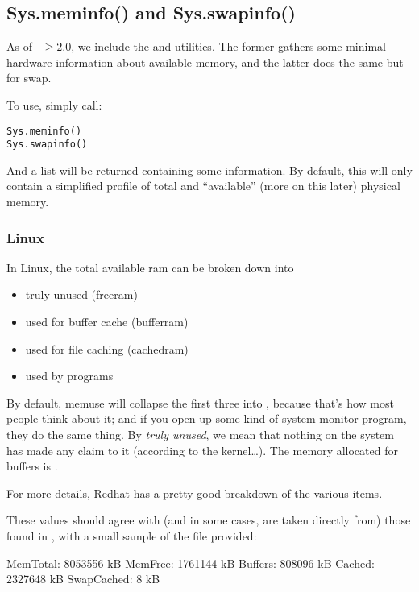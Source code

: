 \subsection{Sys.meminfo() and Sys.swapinfo()}

As of ~$\geq 2.0$, we include the  and 
 utilities.  The former gathers some minimal 
hardware information about available memory, and the latter does the same but 
for swap.

To use, simply call:
\begin{lstlisting}
Sys.meminfo()
Sys.swapinfo()
\end{lstlisting}

And a list will be returned containing some information.  By default, this will 
only contain a simplified profile of total and ``available'' (more on this 
later) physical memory. 





\subsubsection{Linux}
In Linux, the total available ram can be broken down into
\begin{itemize}
  \item truly unused (freeram)
  \item used for buffer cache (bufferram)
  \item used for file caching (cachedram)
  \item used by programs
\end{itemize}

By default, memuse will collapse the first three into , because that's how most people think about it; and if you open up some kind of system monitor program, they do the same thing.  By \emph{truly unused}, we mean that nothing on the system has made any claim to it (according to the kernel\dots).  The memory allocated for buffers is .

For more details, \href{https://www.redhat.com/advice/tips/meminfo.html}{Redhat} has a pretty good breakdown of the various items.


These values should agree with (and in some cases, are taken directly from) those found in 
, with a small sample of the file provided:

\begin{center}
\begin{minipage}{.4\textwidth}
\begin{Output}
MemTotal:        8053556 kB
MemFree:         1761144 kB
Buffers:          808096 kB
Cached:          2327648 kB
SwapCached:            8 kB
\end{Output}
\end{minipage}
\end{center}

